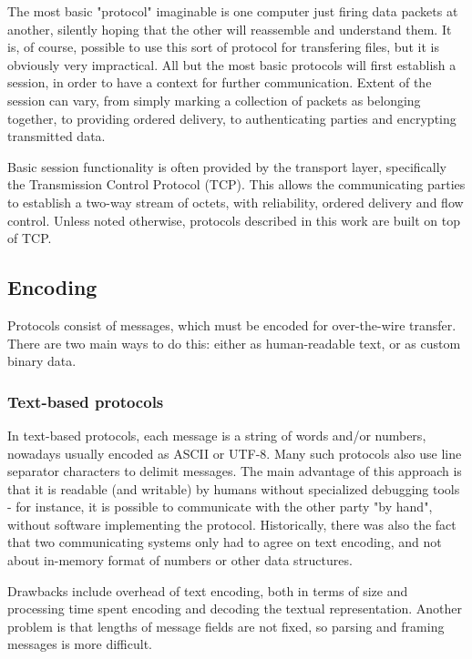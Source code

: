 The most basic "protocol" imaginable is one computer just firing data packets at another, silently hoping that
the other will reassemble and understand them. It is, of course, possible to use this sort of protocol for
transfering files, but it is obviously very impractical. All but the most basic protocols will first establish
a session, in order to have a context for further communication. Extent of the session can vary, from simply
marking a collection of packets as belonging together, to providing ordered delivery, to authenticating
parties and encrypting transmitted data.

Basic session functionality is often provided by the transport layer, specifically the Transmission Control
Protocol (TCP). This allows the communicating parties to establish a two-way stream of octets, with
reliability, ordered delivery and flow control. Unless noted otherwise, protocols described in this work are
built on top of TCP.


\subsection{Encoding}

Protocols consist of messages, which must be encoded for over-the-wire transfer. There are two main ways to do
this: either as human-readable text, or as custom binary data.

\subsubsection{Text-based protocols}

In text-based protocols, each message is a string of words and/or numbers, nowadays usually encoded as ASCII
or UTF-8. Many such protocols also use line separator characters to delimit messages. The main advantage of
this approach is that it is readable (and writable) by humans without specialized debugging tools - for
instance, it is possible to communicate with the other party "by hand", without software implementing the
protocol. Historically, there was also the fact that two communicating systems only had to agree on text
encoding, and not about in-memory format of numbers or other data structures.

Drawbacks include overhead of text encoding, both in terms of size and processing time spent encoding and
decoding the textual representation. Another problem is that lengths of message fields are not fixed, so
parsing and framing messages is more difficult.

